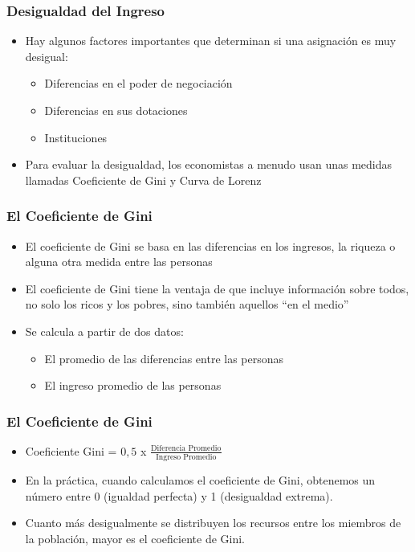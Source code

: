 \documentclass{beamer}
\begin{document}
\begin{frame} 
\frametitle{Desigualdad del Ingreso}
\begin{itemize}
\item Hay algunos factores importantes que determinan si una asignación es muy desigual: \begin{itemize}
    \item Diferencias en el poder de negociación
    \item Diferencias en sus dotaciones
    \item Instituciones
\end{itemize}
\item Para evaluar la desigualdad, los economistas a menudo usan unas medidas llamadas Coeficiente de Gini y Curva de Lorenz
\end{itemize}
\end{frame}

\begin{frame} 
\frametitle{El Coeficiente de Gini}
\begin{itemize}
\item El coeficiente de Gini se basa en las diferencias en los ingresos, la riqueza o alguna otra medida entre las personas
\item El coeficiente de Gini tiene la ventaja de que incluye información sobre todos, no solo los ricos y los pobres, sino también aquellos ``en el medio''
\item Se calcula a partir de dos datos:
        \begin{itemize}
            \item El promedio de las diferencias entre las personas
            \item El ingreso promedio de las personas
        \end{itemize}
\end{itemize}
\end{frame}

\begin{frame} 
\frametitle{El Coeficiente de Gini}
\begin{itemize}
\item Coeficiente Gini = $0,5$ x  $\frac{\text{Diferencia Promedio}}{\text{Ingreso Promedio}}$
\item En la práctica, cuando calculamos el coeficiente de Gini, obtenemos un número entre 0 (igualdad perfecta) y 1 (desigualdad extrema). 
\item Cuanto más desigualmente se distribuyen los recursos entre los miembros de la población, mayor es el coeficiente de Gini.
\end{itemize}
\end{frame}
\end{document}
